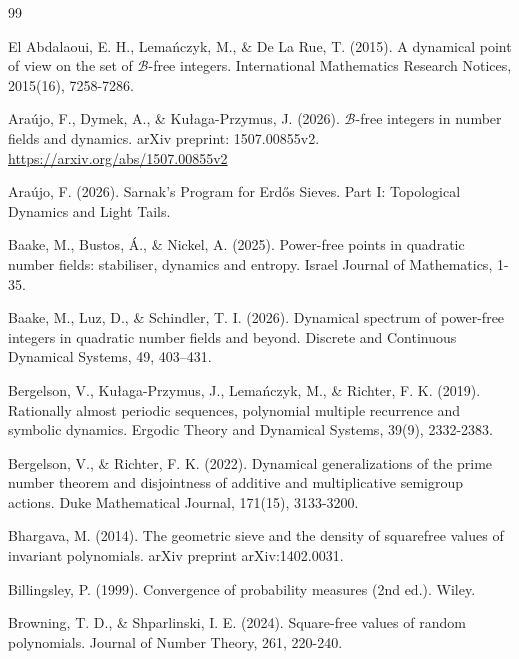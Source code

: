 \documentclass[a4paper,11pt,reqno]{amsart}
\theoremstyle{plain}
\theoremstyle{remark}
\newcommand{\cb}{\mathcal{B}}
\begin{document}
				
				
				
				
				\begin{thebibliography}{99}
					
					
					
					
					El Abdalaoui, E. H., Lemańczyk, M., \& De La Rue, T. (2015). A dynamical point of view on the set of $\cb$-free integers. International Mathematics Research Notices, 2015(16), 7258-7286.
					
					Araújo, F., Dymek, A., \& Kułaga-Przymus, J. (2026). $\cb$-free integers in number fields and dynamics. arXiv preprint: 1507.00855v2.  \url{https://arxiv.org/abs/1507.00855v2}
					
					Araújo, F. (2026). Sarnak's Program for Erd\H{o}s Sieves. Part I: Topological Dynamics and Light Tails.
					
					

					Baake, M., Bustos, Á., \& Nickel, A. (2025). Power-free points in quadratic number fields: stabiliser, dynamics and entropy. Israel Journal of Mathematics, 1-35.
					
					Baake, M., Luz, D., \& Schindler, T. I. (2026). Dynamical spectrum of power-free integers in quadratic number fields and beyond. Discrete and Continuous Dynamical Systems, 49, 403–431.					
					
					
					Bergelson, V., Kułaga-Przymus, J., Lemańczyk, M., \& Richter, F. K. (2019). Rationally almost periodic sequences, polynomial multiple recurrence and symbolic dynamics. Ergodic Theory and Dynamical Systems, 39(9), 2332-2383.
					
					Bergelson, V., \& Richter, F. K. (2022). Dynamical generalizations of the prime number theorem and disjointness of additive and multiplicative semigroup actions. Duke Mathematical Journal, 171(15), 3133-3200.
					
					
					Bhargava, M. (2014). The geometric sieve and the density of squarefree values of invariant polynomials. arXiv preprint arXiv:1402.0031.
					
					Billingsley, P. (1999). Convergence of probability measures (2nd ed.). Wiley.
				
					
					
					Browning, T. D., \& Shparlinski, I. E. (2024). Square-free values of random polynomials. Journal of Number Theory, 261, 220-240.
					

\end{thebibliography}
\end{document}
